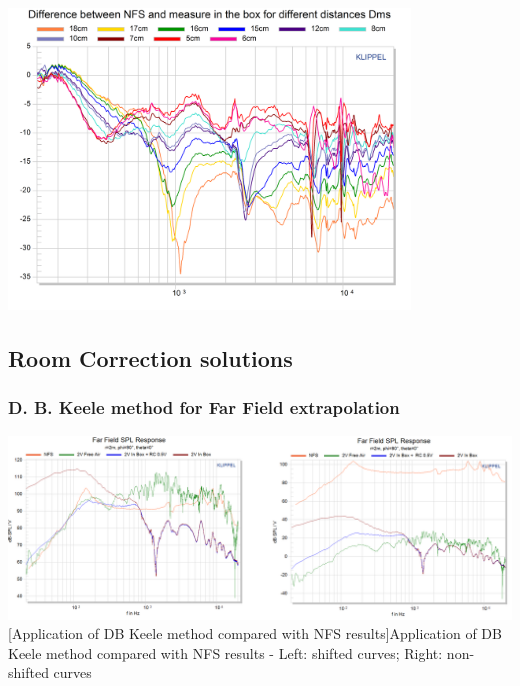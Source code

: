 \documentclass{report}
\begin{document}
\begin{appendices}
\begin{center}
	\includegraphics[width=0.8\textwidth]{RoomComp/MicPos_Diff_NFS_TRF_zoom} 
    \captionsetup{hypcap=false} 
	\label{fig:MicPos_Diff_NFS_Zoom}
\end{center}


\subsection{Room Correction solutions}

\subsubsection{D. B. Keele method for Far Field extrapolation}
\label{Curves:dbkFF}

\begin{center}
	\includegraphics[width=\textwidth]{Appendix/DKeele_FF_All} 
    \captionsetup{hypcap=false} 
	[Application of DB Keele method compared with NFS results]{Application of DB Keele method compared with NFS results - Left: shifted curves; Right: non-shifted curves} 
	\label{fig:dbk_fig}
\end{center}


\end{appendices}
\end{document}
